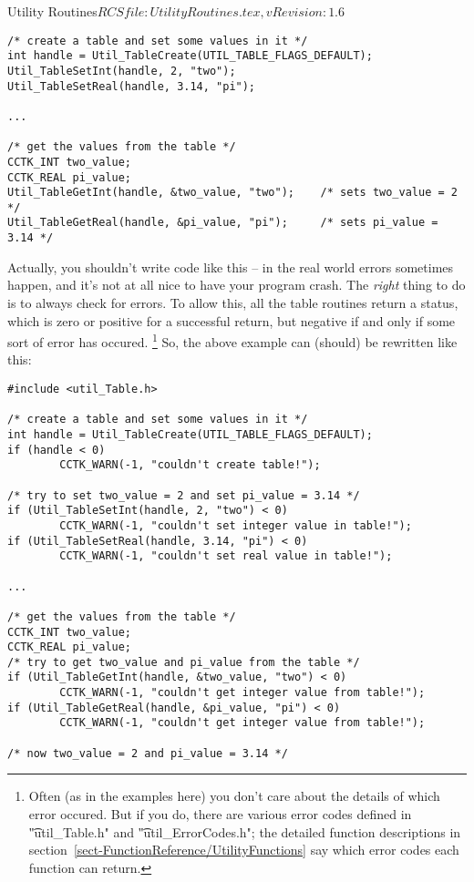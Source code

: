 \begin{cactuspart}{3}{Utility Routines}{$RCSfile: UtilityRoutines.tex,v $}{$Revision: 1.6 $}
\begin{verbatim}
/* create a table and set some values in it */
int handle = Util_TableCreate(UTIL_TABLE_FLAGS_DEFAULT);
Util_TableSetInt(handle, 2, "two");
Util_TableSetReal(handle, 3.14, "pi");

...

/* get the values from the table */
CCTK_INT two_value;
CCTK_REAL pi_value;
Util_TableGetInt(handle, &two_value, "two");    /* sets two_value = 2 */
Util_TableGetReal(handle, &pi_value, "pi");     /* sets pi_value = 3.14 */
\end{verbatim}

Actually, you shouldn't write code like this -- in the real world
errors sometimes happen, and it's not at all nice to have your program
crash.  The {\em right\/} thing to do is to always check for errors.
To allow this, all the table routines return a status, which is
zero or positive for a successful return, but negative if and only
if some sort of error has occured.%
\footnote{%
	 Often (as in the examples here) you don't care
	 about the details of which error occured.  But if
	 you do, there are various error codes defined in
	 {\t "util\_Table.h"} and {\t "util\_ErrorCodes.h"};
	 the detailed function descriptions in
	 section~\ref{sect-FunctionReference/UtilityFunctions}
	 say which error codes each function can return.
	 }%
{}  So, the above example can (should) be rewritten like this:

\begin{verbatim}
#include <util_Table.h>

/* create a table and set some values in it */
int handle = Util_TableCreate(UTIL_TABLE_FLAGS_DEFAULT);
if (handle < 0)
        CCTK_WARN(-1, "couldn't create table!");

/* try to set two_value = 2 and set pi_value = 3.14 */
if (Util_TableSetInt(handle, 2, "two") < 0)
        CCTK_WARN(-1, "couldn't set integer value in table!");
if (Util_TableSetReal(handle, 3.14, "pi") < 0)
        CCTK_WARN(-1, "couldn't set real value in table!");

...

/* get the values from the table */
CCTK_INT two_value;
CCTK_REAL pi_value;
/* try to get two_value and pi_value from the table */
if (Util_TableGetInt(handle, &two_value, "two") < 0)
        CCTK_WARN(-1, "couldn't get integer value from table!");
if (Util_TableGetReal(handle, &pi_value, "pi") < 0)
        CCTK_WARN(-1, "couldn't get integer value from table!");

/* now two_value = 2 and pi_value = 3.14 */
\end{verbatim}


\end{cactuspart}
